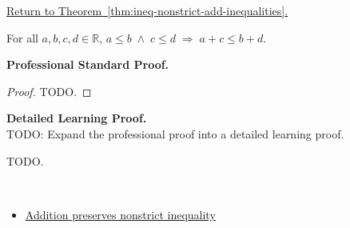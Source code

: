 \newpage
{}
\label{prf:ineq-nonstrict-add-inequalities}

\begin{remark*}[Return]
\hyperref[thm:ineq-nonstrict-add-inequalities]{Return to Theorem~\ref*{thm:ineq-nonstrict-add-inequalities}.}
\end{remark*}

\begin{theorem*}
For all $a, b, c, d \in \mathbb{R}$,
$a \le b \;\land\; c \le d \;\Rightarrow\; a + c \le b + d$.
\end{theorem*}

\textbf{Professional Standard Proof.}~\\
\begin{proof}
TODO.
\end{proof}

\textbf{Detailed Learning Proof.}~\\
TODO: Expand the professional proof into a detailed learning proof.


\begin{remark*}
TODO.
\end{remark*}

\begin{remark*}[Dependencies]~\\
\begin{itemize}
  \item \hyperref[thm:ineq-nonstrict-add-both-sides]{Addition preserves nonstrict inequality}
\end{itemize}
\end{remark*}
